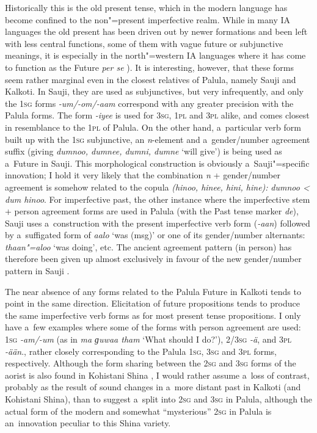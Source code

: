 Historically this is the old present tense, which in the modern language has become confined to the non"=present imperfective realm. While in many IA languages the old present has been driven out by newer formations and been left with less central functions, some of them with vague future or subjunctive meanings, it is especially in the north"=western IA languages where it has come to function as the Future \textit{per se} \citep[288]{masica1991}). It is interesting, however, that these forms seem rather marginal even in the closest relatives of Palula, namely Sauji and Kalkoti. In Sauji, they are used as subjunctives, but very infrequently, and only the \textsc{1sg} forms \textit{-um/-om/-aam} correspond with any greater precision with the Palula forms. The form \textit{-iyee} is used for \textsc{3sg}, \textsc{1pl} and \textsc{3pl} alike, and comes closest in resemblance to the \textsc{1pl} of Palula. On the other hand, a~particular verb form built up with the \textsc{1sg} subjunctive, an \textit{n}-element and a~gender/number agreement suffix (giving \textit{dumnoo, dumnee, dumni, dumne} `will give') is being used as a~Future in Sauji. This morphological construction is obviously a~Sauji"=specific innovation; I hold it very likely that the combination \textit{n} + gender/number agreement is somehow related to the copula \textit{(hinoo, hinee, hini, hine):} \textit{dumnoo {\textless} dum hinoo}. For imperfective past, the other instance where the imperfective stem + person agreement forms are used in Palula (with the Past tense marker \textit{de}), Sauji uses a~construction with the present imperfective verb form (\textit{-aan}) followed by a~suffigated form of \textit{aalo} `was (msg)' or one of its gender/number alternants: \textit{thaan"=aloo} `was doing', etc. The ancient agreement pattern (in person) has therefore been given up almost exclusively in favour of the new gender/number pattern in Sauji \citep[46--54]{buddruss1967}.



The near absence of any forms related to the Palula Future in Kalkoti tends to point in the same direction. Elicitation of future propositions tends to produce the same imperfective verb forms as for most present tense propositions. I only have a~few examples where some of the forms with person agreement are used: \textsc{1sg} \textit{-am/-um} (as in \textit{ma ɡuwaa tham} `What should I do?'), \textsc{2/3sg} \textit{-ä}, and \textsc{3pl} \textit{-ään}., rather closely corresponding to the Palula \textsc{1sg}, \textsc{3sg} and \textsc{3pl} forms, respectively. Although the form sharing between the \textsc{2sg} and \textsc{3sg} forms of the aorist is also found in Kohistani Shina \citep[39]{schmidt2002}, I would rather assume a~loss of contrast, probably as the result of sound changes in a~more distant past in Kalkoti (and Kohistani Shina), than to suggest a~split into \textsc{2sg} and \textsc{3sg} in Palula, although the actual form of the modern and somewhat ``mysterious'' \textsc{2sg} in Palula is an~innovation peculiar to this Shina variety.


